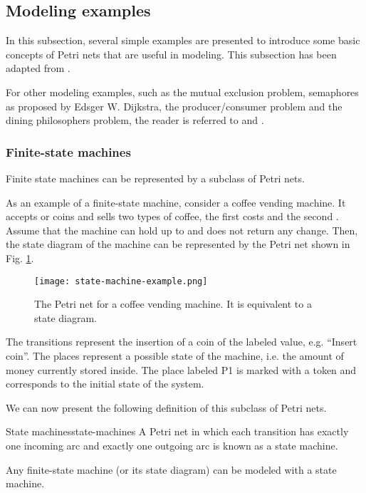 \documentclass[../Thesis.tex]{subfiles}
\begin{document}
\subsection{Modeling examples}

In this subsection, several simple examples are presented to introduce
some basic concepts of Petri nets that are useful in modeling.
This subsection has been adapted from \cite{murata1989}.

For other modeling examples, such as the mutual exclusion problem,
semaphores as proposed by Edsger W. Dijkstra, the producer/consumer problem
and the dining philosophers problem, the reader is referred to
\cite[Chapter 3]{peterson1981} and \cite{reisig2013}.

\subsubsection{Finite-state machines}

Finite state machines can be represented by a subclass of Petri nets.

As an example of a finite-state machine, consider a coffee vending machine.
It accepts  or  coins and sells two types of coffee, the first costs  and the second .
Assume that the machine can hold up to  and does not return any change.
Then, the state diagram of the machine can be represented
by the Petri net shown in Fig. \ref{fig:state-machine-example}.

\begin{figure}[H]
    \centering
    \texttt{[image: state-machine-example.png]}
    \caption{The Petri net for a coffee vending machine. It is equivalent to a state diagram.}
    \label{fig:state-machine-example}
\end{figure}

The transitions represent the insertion of a coin of the labeled value, e.g. ``Insert  coin''.
The places represent a possible state of the machine, i.e. the amount of money currently stored inside.
The place labeled \uppercase{P1} is marked with a token and corresponds to the initial state of the system.

We can now present the following definition of this subclass of Petri nets.

\begin{definition}{State machines}{state-machines}
    A Petri net in which each transition has exactly one incoming arc
    and exactly one outgoing arc is known as a state machine.

    Any finite-state machine (or its state diagram) can be modeled with a state machine.
\end{definition}
\end{document}
